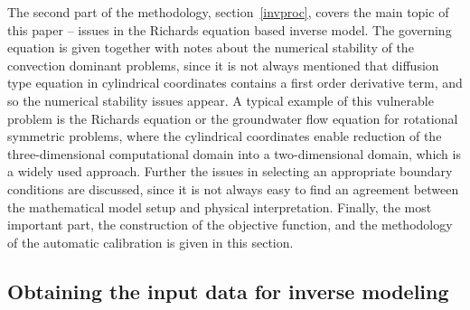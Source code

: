 \documentclass[review]{myarticle}
\begin{document}
The second part of the methodology, section~\ref{invproc}, covers the main topic of this paper --  issues in the Richards equation based inverse model. The governing equation is given together with  notes about the numerical stability of the convection dominant problems, since it is not always mentioned that diffusion type equation in cylindrical coordinates  contains a first order derivative term,  and so the numerical stability issues appear. A typical example of this vulnerable problem is the Richards equation or the groundwater flow equation for rotational symmetric problems, where the cylindrical coordinates enable reduction of the three-dimensional computational domain into a two-dimensional domain, which is a widely used approach.
Further the issues in selecting an appropriate boundary conditions are discussed, since it is not always easy to find an agreement between the mathematical model setup and  physical interpretation. Finally, the most important part, the construction of the objective function, and the methodology of the automatic calibration is given in this section. 



\subsection{Obtaining the input data for inverse modeling}
\label{assamb}
\end{document}
